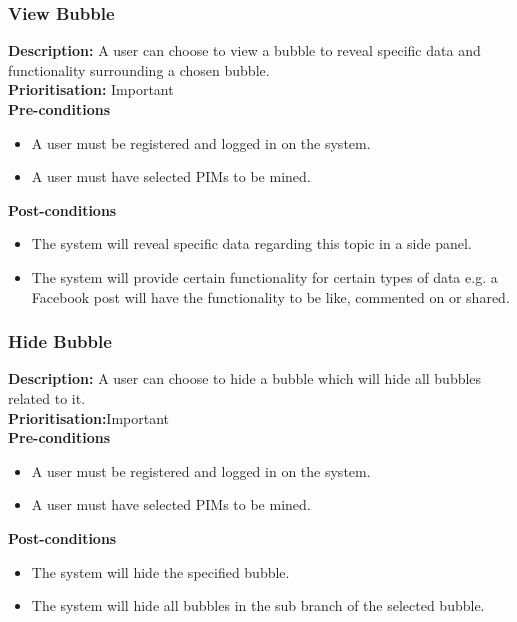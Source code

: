 \documentclass[hidelinks,english]{article}
\begin{document}
			\subsubsection{View Bubble}
				\textbf{Description:}  A user can choose to view a bubble to reveal specific data and functionality surrounding a chosen bubble.\\
			    \textbf{Prioritisation:} Important\\
			    \textbf{Pre-conditions}
			    \begin{itemize}
			        \item A user must be registered and logged in on the system.
			        \item A user must have selected PIMs to be mined.
			    \end{itemize}
				\textbf{Post-conditions}
				\begin{itemize}
					\item The system will reveal specific data regarding this topic in a side panel.
					\item The system will provide certain functionality for certain types of data e.g. a Facebook post will have the functionality to be like, commented on or shared.
				\end{itemize}
				
   			\subsubsection{Hide Bubble}
				\textbf{Description:}  A user can choose to hide a bubble which will hide all bubbles related to it.\\
			    \textbf{Prioritisation:}Important\\
     			\textbf{Pre-conditions}
				\begin{itemize}
					\item A user must be registered and logged in on the system.
					\item A user must have selected PIMs to be mined.
				\end{itemize}
    			\textbf{Post-conditions}
     			\begin{itemize}
			        \item The system will hide the specified bubble.
			        \item The system will hide all bubbles in the sub branch of the selected bubble.
    			\end{itemize}
    			
\end{document}
